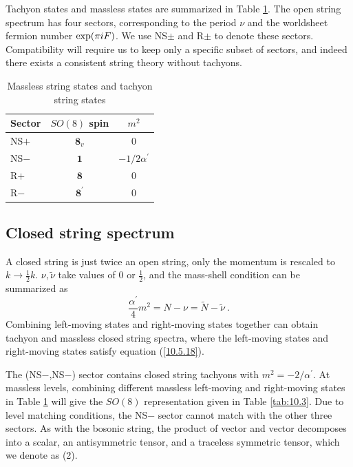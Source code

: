 	Tachyon states and massless states are summarized in Table \ref{tab:10.2}. The open string spectrum has four sectors, corresponding to the period $\nu$ and the worldsheet fermion number $\exp(\pi i F)$. We use NS$\pm$ and R$\pm$ to denote these sectors. Compatibility will require us to keep only a specific subset of sectors, and indeed there exists a consistent string theory without tachyons.
	\begin{table}[h]
		\caption{Massless string states and tachyon string states}
		\label{tab:10.2}%
		\centering
		\begin{tabular}[c]{lcc}
			\hline\hline
			\quad\vphantom{\Big(}Sector \quad &\quad $SO(8) $ spin \quad &\quad  $m^{2}$\quad \\
			\hline
			\quad NS$+$ \quad & $\mathbf{8}_{v} $& 0 \\
			\quad NS$-$ \quad & $\mathbf{1} $    & $-1/2\alpha^{\prime}$\\
			\quad R$+$ \quad   & $\mathbf{8}   $  & 0\\
			\quad R$-$ \quad  & $\mathbf{8}^{\prime}$ & 0 \\
			\hline\hline
		\end{tabular}
	\end{table}
	
	
	\subsection*{Closed string spectrum}
	
	A closed string is just twice an open string, only the momentum is rescaled to $k\to\frac{1}{2}k$. $\nu,\tilde{\nu}$ take values of 0 or $\frac{1}{2}$, and the mass-shell condition can be summarized as
	\begin{equation}
		\frac{\alpha^{\prime}}{4}m^{2} = N-\nu =\tilde{N} -\tilde{\nu} \:. \label{10.5.18}
	\end{equation}
	Combining left-moving states and right-moving states together can obtain tachyon and massless closed string spectra, where the left-moving states and right-moving states satisfy equation (\ref{10.5.18}).
	
	The (NS$-$,NS$-$) sector contains closed string tachyons with $m^{2}=-2/\alpha^{\prime}$. At massless levels, combining different massless left-moving and right-moving states in Table \ref{tab:10.2} will give the $SO(8)$ representation given in Table \ref{tab:10.3}. Due to level matching conditions, the NS$-$ sector cannot match with the other three sectors. As with the bosonic string, the product of vector and vector decomposes into a scalar, an antisymmetric tensor, and a traceless symmetric tensor, which we denote as (2).
	
